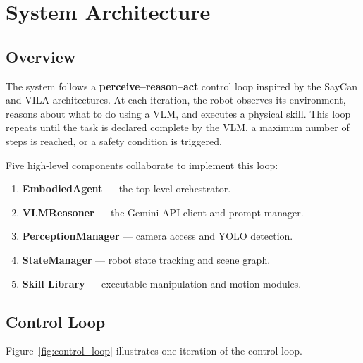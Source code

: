 \chapter{System Architecture}
\label{ch:architecture}

\section{Overview}

The system follows a \textbf{perceive--reason--act} control loop inspired by the
SayCan \cite{ahn2022saycan} and VILA \cite{lin2024vila} architectures.
At each iteration, the robot observes its environment, reasons about what to do using
a VLM, and executes a physical skill.
This loop repeats until the task is declared complete by the VLM, a maximum number
of steps is reached, or a safety condition is triggered.

Five high-level components collaborate to implement this loop:

\begin{enumerate}
  \item \textbf{EmbodiedAgent} — the top-level orchestrator.
  \item \textbf{VLMReasoner} — the Gemini API client and prompt manager.
  \item \textbf{PerceptionManager} — camera access and YOLO detection.
  \item \textbf{StateManager} — robot state tracking and scene graph.
  \item \textbf{Skill Library} — executable manipulation and motion modules.
\end{enumerate}

\section{Control Loop}

Figure~\ref{fig:control_loop} illustrates one iteration of the control loop.

